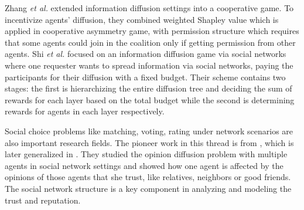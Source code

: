 \documentclass{article}
\begin{document}
Zhang \emph{et al.}  extended information diffusion settings into a cooperative game. To incentivize agents' diffusion, they combined weighted Shapley value\cite{RADZIK2012407} which is applied in cooperative asymmetry game, with permission structure\cite{gilles1992games} which requires that some agents could join in the coalition only if getting permission from other agents. Shi \emph{et al.}  focused on an information diffusion game via social networks where one requester wants to spread information via social networks, paying the participants for their diffusion with a fixed budget.
Their scheme contains two stages: the first is hierarchizing the entire diffusion tree and deciding the sum of rewards for each layer based on the total budget while the second is determining rewards for agents in each layer respectively.

Social choice problems like matching, voting, rating under network scenarios are also important research fields. The pioneer work in this thread is from \cite{10.5555/2772879.2773278}, which is later generalized in \cite{grandi2017strategic,grandi2020personalised}. They studied the opinion diffusion problem with multiple agents in social network settings and showed how one agent is affected by the opinions of those agents that she trust, like relatives, neighbors or good friends. The social network structure is a key component in analyzing and modeling the trust and reputation. 
\end{document}
